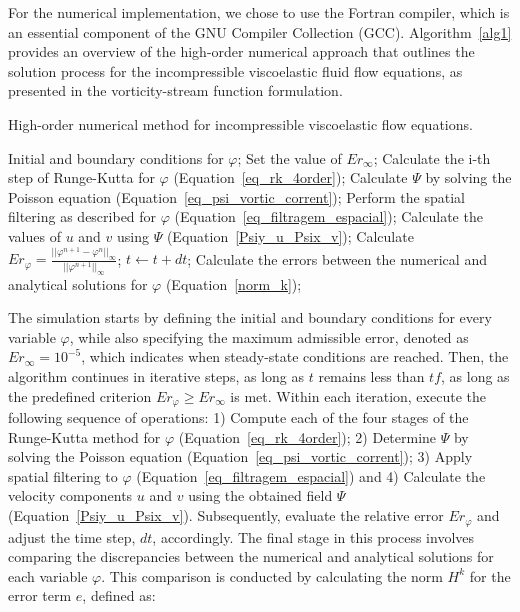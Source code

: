 \documentclass[preprint, 12pt]{elsarticle}
\begin{document}
{\color{red} For the numerical implementation, we chose to use the Fortran compiler, which
is an essential component of the GNU Compiler Collection (GCC).
Algorithm~\ref{alg1} provides an overview of the high-order numerical approach
that outlines the solution process for the incompressible viscoelastic fluid
flow equations, as presented in the vorticity-stream function formulation.}

\begin{algorithm}
\caption{High-order numerical method for incompressible viscoelastic flow equations.}
\label{alg1}
\begin{algorithmic}[1]
  \State Initial and boundary conditions for $\varphi$;
  \State Set the value of $Er_{\infty}$; 
       \State Calculate the i-th step of Runge-Kutta for $\varphi$ (Equation~\ref{eq_rk_4order});
       \State Calculate $\Psi$ by solving the Poisson equation (Equation~\ref{eq_psi_vortic_corrent});
       \State Perform the spatial filtering as described for $\varphi$ (Equation~\ref{eq_filtragem_espacial});
       \State Calculate the values of $u$ and $v$ using $\Psi$ (Equation~\ref{Psiy_u_Psix_v});
    \EndFor
    \State Calculate $Er_{\varphi} = \frac{||\varphi^{n+1} - \varphi^{n}||_{\infty}}{||\varphi^{n+1}||_{\infty}}$; 
    \State $t \gets t + dt $; 
  \EndWhile
  \State Calculate the errors between the numerical and analytical solutions for $\varphi$ (Equation~\eqref{norm_k});
\EndFunction
\end{algorithmic}
\end{algorithm}
\normalsize

The simulation starts by defining the initial and boundary conditions for every
variable $\varphi$, while also specifying the maximum admissible error, denoted
as $Er_{\infty} = 10^{-5}$, which indicates when steady-state conditions are
reached. Then, the algorithm continues in iterative steps, as long as $t$
remains less than $tf$, as long as the predefined criterion $Er_{\varphi} \geq
Er_{\infty}$ is met. Within each iteration, execute the following sequence of
operations: 1) Compute each of the four stages of the Runge-Kutta method for
$\varphi$ (Equation~\eqref{eq_rk_4order}); 2) Determine $\Psi$ by solving the
Poisson equation (Equation~\eqref{eq_psi_vortic_corrent}); 3) Apply spatial
filtering to $\varphi$ (Equation~\eqref{eq_filtragem_espacial}) and 4)
Calculate the velocity components $u$ and $v$ using the obtained field $\Psi$
(Equation~\eqref{Psiy_u_Psix_v}). Subsequently, evaluate the relative error
$Er_{\varphi}$ and adjust the time step, $dt$, accordingly. The final stage in
this process involves comparing the discrepancies between the numerical and
analytical solutions for each variable $\varphi$. This comparison is conducted
by calculating the norm $H^k$ for the error term $e$, defined as:
\end{document}
